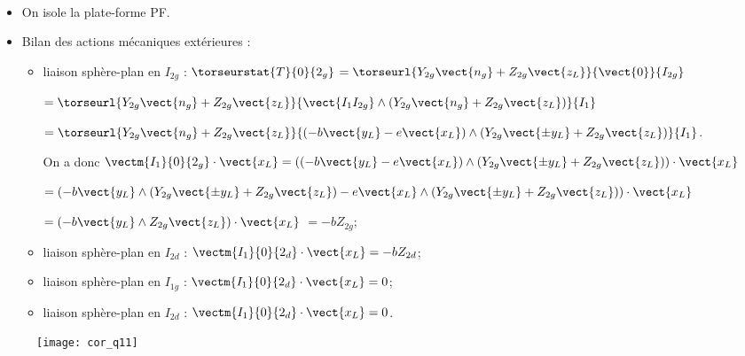 \ifprof
\begin{corrige}~\\
\begin{minipage}[c]{.47\linewidth}
\begin{itemize}
\item On isole la plate-forme PF. 
\item Bilan des actions mécaniques extérieures : 
\begin{itemize}
\item liaison sphère-plan en $I_{2g}$ : $\torseurstat{T}{0}{2_g}$ 
$=\torseurl{Y_{2g}\vect{n_g}+Z_{2g}\vect{z_L}}{\vect{0}}{I_{2g}}$

$=\torseurl{Y_{2g}\vect{n_g}+Z_{2g}\vect{z_L}}{\vect{I_1I_{2g}}\wedge \left( Y_{2g}\vect{n_g}+Z_{2g}\vect{z_L} \right)}{I_{1}}$

$=\torseurl{Y_{2g}\vect{n_g}+Z_{2g}\vect{z_L}}{\left(-b\vect{y_L}-e\vect{x_L} \right)\wedge \left( Y_{2g}\vect{\pm y_L}+Z_{2g}\vect{z_L} \right)}{I_{1}}$.

On a donc $\vectm{I_1}{0}{2_g}\cdot \vect{x_L}=\left( \left(-b\vect{y_L}-e\vect{x_L} \right)\wedge \left( Y_{2g}\vect{\pm y_L}+Z_{2g}\vect{z_L} \right)\right) \cdot \vect{x_L}$

$= \left(-b\vect{y_L}\wedge \left( Y_{2g}\vect{\pm y_L}+Z_{2g}\vect{z_L} \right)-e\vect{x_L} \wedge \left( Y_{2g}\vect{\pm y_L}+Z_{2g}\vect{z_L} \right)\right) \cdot \vect{x_L}$

$= \left(-b\vect{y_L}\wedge  Z_{2g}\vect{z_L} \right) \cdot \vect{x_L}$
$= -b Z_{2g}$;

\item liaison sphère-plan en $I_{2d}$ :
 $\vectm{I_1}{0}{2_d}\cdot \vect{x_L}=-bZ_{2d} $;
\item liaison sphère-plan en $I_{1g}$ :
 $\vectm{I_1}{0}{2_d}\cdot \vect{x_L}=0$;
  \item liaison sphère-plan en $I_{2d}$ :
 $\vectm{I_1}{0}{2_d}\cdot \vect{x_L}=0$.
\end{itemize}
\end{itemize}
\end{minipage} \hfill
\begin{minipage}[c]{.47\linewidth}
\begin{figure}[H]
\centering
\texttt{[image: cor\_q11]}
\end{figure}
\end{minipage}


\end{corrige}
